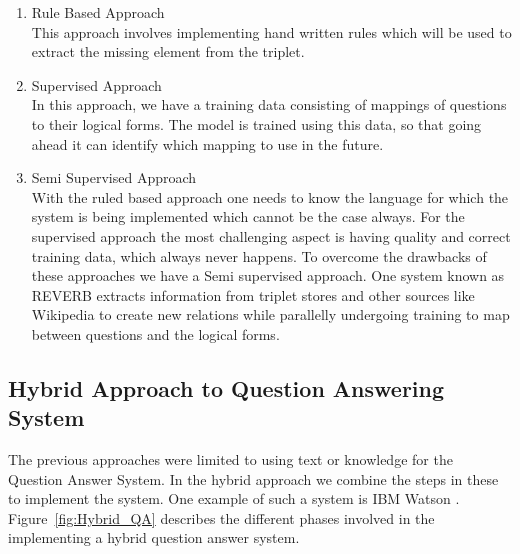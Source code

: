 \begin{enumerate}

\item Rule Based Approach \\
This approach involves implementing hand written rules which will be used to extract the missing element from the triplet.
 
 \item Supervised Approach \\
In this approach, we have a training data consisting of mappings of questions to their logical forms. The model is trained using this data, so that going ahead it can identify which mapping to use in the future.
 
 \item Semi Supervised Approach \\
With the ruled based approach one needs to know the language for which the system is being implemented which cannot be the case always. For the supervised approach the most challenging aspect is having quality and correct training data, which always never happens. To overcome the drawbacks of these approaches we have a Semi supervised approach. One system known as REVERB extracts information from triplet stores and other sources like Wikipedia to create new relations while parallelly undergoing training to map between questions and the logical forms.

\end{enumerate}

\subsection{Hybrid Approach to Question Answering System}
The previous approaches were limited to using text or knowledge for the Question Answer System. In the hybrid approach we combine the steps in these to implement the system. One example of such a system is IBM Watson \cite {high2012era}. Figure~\ref{fig:Hybrid_QA} describes the different phases involved in the implementing a hybrid question answer system. 

